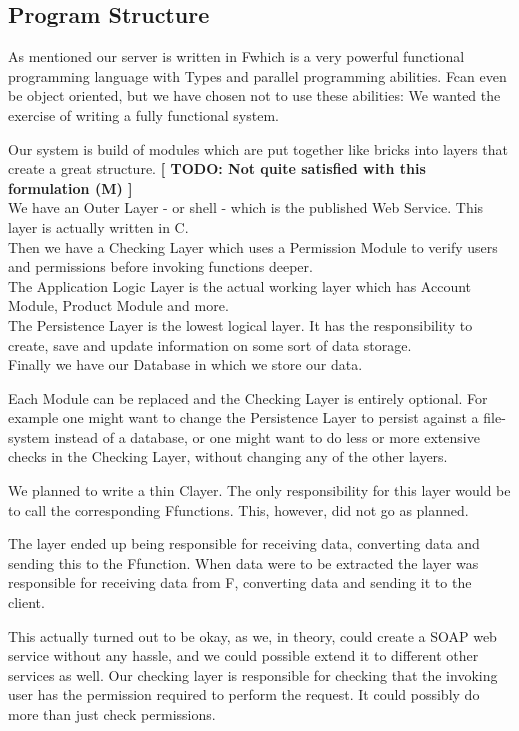 \subsection{Program Structure}
As mentioned our server is written in F\Sh which is a very powerful functional programming language with Types and parallel programming abilities. F\Sh can even be object oriented, but we have chosen not to use these abilities: We wanted the exercise of writing a fully functional system.

Our system is build of modules which are put together like bricks into layers that create a great structure. \textbf{[ TODO: Not quite satisfied with this formulation (M) ]}
\\We have an Outer Layer - or shell - which is the published Web Service. This layer is actually written in C\Sh.
\\Then we have a Checking Layer which uses a Permission Module to verify users and permissions before invoking functions deeper.
\\The Application Logic Layer is the actual working layer which has Account Module, Product Module and more.
\\The Persistence Layer is the lowest logical layer. It has the responsibility to create, save and update information on some sort of data storage.
\\Finally we have our Database in which we store our data.

Each Module can be replaced and the Checking Layer is entirely optional. For example one might want to change the Persistence Layer to persist against a file-system instead of a database, or one might want to do less or more extensive checks in the Checking Layer, without changing any of the other layers.

We planned to write a thin C\Sh layer. The only responsibility for this layer would be to call the corresponding F\Sh functions. This, however, did not go as planned.

The layer ended up being responsible for receiving data, converting data and sending this to the F\Sh function. When data were to be extracted the layer was responsible for receiving data from F\Sh, converting data and sending it to the client.

This actually turned out to be okay, as we, in theory, could create a SOAP web service without any hassle, and we could possible extend it to different other services as well.
Our checking layer is responsible for checking that the invoking user has the permission required to perform the request. It could possibly do more than just check permissions.

